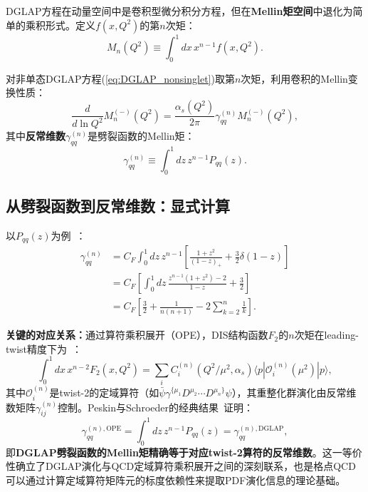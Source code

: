 \documentclass[12pt,a4paper]{ctexart}
\theoremstyle{definition}
\begin{document}
DGLAP方程在动量空间中是卷积型微分积分方程，但在\textbf{Mellin矩空间}中退化为简单的乘积形式。定义$f(x, Q^2)$的第$n$次矩：
\begin{equation}
M_n(Q^2) \equiv \int_0^1 dx\, x^{n-1} f(x, Q^2).
\label{eq:mellin_moment}
\end{equation}

对非单态DGLAP方程(\ref{eq:DGLAP_nonsinglet})取第$n$次矩，利用卷积的Mellin变换性质：
\begin{equation}
\frac{d}{d\ln Q^2} M_n^{(-)}(Q^2) = \frac{\alpha_s(Q^2)}{2\pi} \gamma_{qq}^{(n)} M_n^{(-)}(Q^2),
\label{eq:moment_DGLAP}
\end{equation}
其中\textbf{反常维数}$\gamma_{qq}^{(n)}$是劈裂函数的Mellin矩：
\begin{equation}
\gamma_{qq}^{(n)} \equiv \int_0^1 dz\, z^{n-1} P_{qq}(z).
\label{eq:anomalous_dim_P}
\end{equation}

\subsection{从劈裂函数到反常维数：显式计算}

以$P_{qq}(z)$为例~\cite{PeskinSchroeder1995}：
\begin{equation}
\begin{aligned}
\gamma_{qq}^{(n)} &= C_F \int_0^1 dz\, z^{n-1} \left[ \frac{1+z^2}{(1-z)_+} + \frac{3}{2}\delta(1-z) \right] \\
&= C_F \left[ \int_0^1 dz\, \frac{z^{n-1}(1+z^2) - 2}{1-z} + \frac{3}{2} \right] \\
&= C_F \left[ \frac{3}{2} + \frac{1}{n(n+1)} - 2\sum_{k=2}^n \frac{1}{k} \right].
\end{aligned}
\label{eq:gamma_qq_explicit}
\end{equation}

\textbf{关键的对应关系：}通过算符乘积展开（OPE），DIS结构函数$F_2$的$n$次矩在leading-twist精度下为~\cite{PeskinSchroeder1995}：
\begin{equation}
\int_0^1 dx\, x^{n-2} F_2(x, Q^2) = \sum_i C_i^{(n)}(Q^2/\mu^2, \alpha_s) \langle p | \mathcal{O}_i^{(n)}(\mu^2) | p \rangle,
\label{eq:OPE_moment}
\end{equation}
其中$\mathcal{O}_i^{(n)}$是twist-2的定域算符（如$\bar\psi\gamma^{\{\mu_1}D^{\mu_2}\cdots D^{\mu_n\}}\psi$），其重整化群演化由反常维数矩阵$\gamma_{ij}^{(n)}$控制。Peskin与Schroeder的经典结果~\cite{PeskinSchroeder1995}证明：
\begin{equation}
\boxed{\gamma_{qq}^{(n),\text{OPE}} = \int_0^1 dz\, z^{n-1} P_{qq}(z) = \gamma_{qq}^{(n),\text{DGLAP}}},
\label{eq:OPE_DGLAP_equivalence}
\end{equation}
即\textbf{DGLAP劈裂函数的Mellin矩精确等于对应twist-2算符的反常维数}。这一等价性确立了DGLAP演化与QCD定域算符乘积展开之间的深刻联系，也是格点QCD可以通过计算定域算符矩阵元的标度依赖性来提取PDF演化信息的理论基础。
\end{document}
